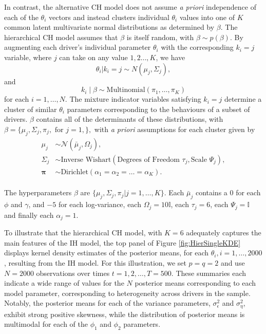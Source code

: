 \documentclass[12pt,a4paper]{article}\usepackage[]{graphicx}\usepackage[]{color}
\begin{document}
In contrast, the alternative CH model does not assume \textit{a priori} independence of each of the $\theta_i$ vectors and instead clusters individual $\theta_i$ values into one of $K$ common latent multivariate normal distributions as determined by $\beta.$ The hierarchical CH model assumes that $\beta$ is itself random, with $\beta \sim p(\beta)$. By augmenting each driver's individual parameter $\theta_i$ with the corresponding $k_i=j$ variable, where $j$ can take on any value $1,2 \ldots, K$, we have
\begin{equation}
\label{mixPrior}
\theta_i | k_i = j \sim N(\mu_j, \Sigma_j),
\end{equation}
and
\begin{equation}
k_i \mid \beta \sim \mbox{Multinomial}\left(\pi_1, \dots, \pi_{K}\right)
\end{equation}
for each $i = 1, \dots, N$. The mixture indicator variables satisfying $k_i=j$ determine a cluster of similar $\theta_i$ parameters corresponding to the behaviours of a subset of drivers. $\beta$ contains all of the determinants of these distributions, with $\beta = \{\mu_j,\Sigma_j, \pi_j, \mbox{ for } j=1,\},$ with \textit{a priori} assumptions for each cluster given by  
\begin{align}
\mu_j &\sim \mathcal{N}\left(\bar{\mu}_j, \Omega_j\right), \\
\Sigma_j &\sim \mbox{Inverse Wishart}\left(\mbox{Degrees of Freedom } \tau_j, \mbox{Scale } \Psi_j\right), \\
\boldsymbol{\pi} &\sim \mbox{Dirichlet}\left(\alpha_1 = \alpha_2 = \dots = \alpha_K\right).
\end{align}
\\

The hyperparameters $\beta$ are $\{\mu_j, \Sigma_j, \pi_j | j = 1, \dots, K\}$. Each $\bar{\mu}_j$ contains a $0$ for each $\phi$ and $\gamma$, and $-5$ for each log-variance, each $\Omega_j = 10 \mathbb{I}$, each $\tau_j = 6$, each $\Psi_j = \mathbb{I}$ and finally each $\alpha_j = 1$. 

To illustrate that the hierarchical CH model, with $K=6$ adequately captures the main features of the IH model, the top panel of Figure \ref{fig:HierSingleKDE} displays kernel density estimates of the posterior means, for each $\theta_i, i = 1, \dots, 2000$, resulting from the IH model. For this illustration, we set $p = q = 2$ and use $N=2000$ observations over times $t=1, 2, \ldots, T = 500$. These summaries each indicate a wide range of values for the $N$ posterior means corresponding to each model parameter, corresponding to heterogeneity across drivers in the sample. Notably, the posterior means for each of the variance parameters, $\sigma^2_{\epsilon}$ and $\sigma^2_{\eta}$, exhibit strong positive skewness, while the distribution of posterior means is multimodal for each of the $\phi_1$ and $\phi_2$ parameters.
\end{document}
